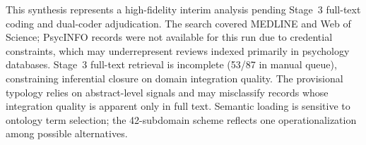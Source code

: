 This synthesis represents a high-fidelity interim analysis pending Stage~3 full-text coding and dual-coder adjudication. The search covered MEDLINE and Web of Science; PsycINFO records were not available for this run due to credential constraints, which may underrepresent reviews indexed primarily in psychology databases. Stage~3 full-text retrieval is incomplete (53/87 in manual queue), constraining inferential closure on domain integration quality. The provisional typology relies on abstract-level signals and may misclassify records whose integration quality is apparent only in full text. Semantic loading is sensitive to ontology term selection; the 42-subdomain scheme reflects one operationalization among possible alternatives.
